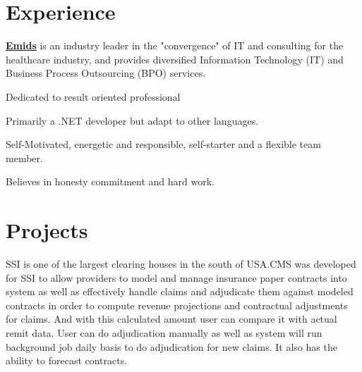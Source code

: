 \documentclass[]{deedy-resume-openfont}
\begin{document}
\begin{minipage}[t]{0.66\textwidth} 


\section{Experience}
\vspace{\topsep} %
\textbf{\href{http://www.eMids.com}{Emids}} is an industry leader in the "convergence" of IT and consulting for the healthcare industry, and provides diversified Information Technology (IT) and Business Process Outsourcing (BPO) services. 
\sectionsep

\vspace{\topsep}
\vspace{\topsep} %
\begin{tightemize}
\item Dedicated to result oriented professional
\item Primarily a .NET developer but adapt to other languages.
\item Self-Motivated, energetic and responsible, self-starter and a flexible team member.
\item Believes in honesty commitment and hard work.
\end{tightemize}
\sectionsep

\vspace{\topsep}
\section{Projects}
\descript{}
\vspace{\topsep}
SSI is one of the largest clearing houses in the south of USA.CMS was developed for SSI to allow providers to model and manage insurance paper contracts into system as well as effectively handle claims and adjudicate them against modeled contracts in order to compute revenue projections and contractual adjustments for claims. And with this calculated amount user can compare it with actual remit data. User can do adjudication manually as well as system will run background job daily basis to do adjudication for new claims. It also has the ability to forecast contracts. 
\sectionsep


\end{minipage}
\end{document}

